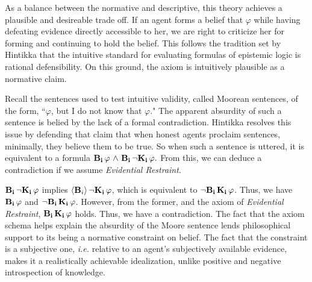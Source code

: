 As a balance between the normative and descriptive, this theory achieves a plausible and desireable trade off. If an agent forms a belief that $\varphi$ while having defeating evidence directly accessible to her, we are right to criticize her for forming and continuing to hold the belief. This follows the tradition set by Hintikka that the intuitive standard for evaluating formulas of epistemic logic is rational defensibility. On this ground, the axiom is intuitively plausible as a normative claim. 

Recall the sentences used to test intuitive validity, called Moorean sentences, of the form, ``$\varphi$, but I do not know that $\varphi$." The apparent absurdity of such a sentence is belied by the lack of a formal contradiction. Hintikka resolves this issue by defending that claim that when honest agents proclaim sentences, minimally, they believe them to be true. So when such a sentence is uttered, it is equivalent to a formula $\mathbf{B}_{\mathbf{i}}\,\varphi {\ \wedge \ } \mathbf{B}_{\mathbf{i}}\,{\neg}\mathbf{K}_{\mathbf{i}}\,\varphi.$  From this, we can deduce a contradiction if we assume \emph{Evidential Restraint}.

$\mathbf{B}_{\mathbf{i}}\,{\neg}\mathbf{K}_{\mathbf{i}}\,\varphi$ implies $\langle \mathbf{B}_{i} \rangle\,{\neg}\mathbf{K}_{\mathbf{i}}\,\varphi$, which is equivalent to ${\neg}\mathbf{B}_{\mathbf{i}}\,\mathbf{K}_{\mathbf{i}}\,\varphi$. Thus, we have $\mathbf{B}_{\mathbf{i}}\,\varphi$ and ${\neg}\mathbf{B}_{\mathbf{i}}\,\mathbf{K}_{\mathbf{i}}\,\varphi$. However, from the former, and the axiom of \emph{Evidential Restraint}, $\mathbf{B}_{\mathbf{i}}\,\mathbf{K}_{\mathbf{i}}\,\varphi$ holds. Thus, we have a contradiction. The fact that the axiom schema helps explain the absurdity of the Moore sentence lends philosophical support to its being a normative constraint on belief. The fact that the constraint is a subjective one, \emph{i.e.} relative to an agent's subjectively available evidence, makes it a realistically achievable idealization, unlike positive and negative introspection of knowledge.

 
